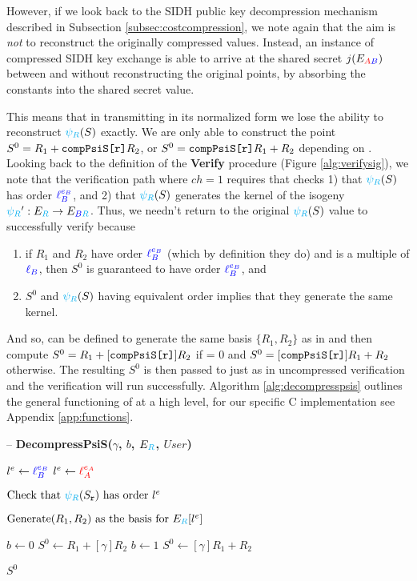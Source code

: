 However, if we look back to the SIDH public key decompression mechanism described in Subsection \ref{subsec:costcompression}, we note again that the aim is \textit{not} to reconstruct the originally compressed values. Instead, an instance of compressed SIDH key exchange is able to arrive at the shared secret $j(E_{\textcolor{red}{A}\textcolor{blue}{B}})$ between \alice and \bob without reconstructing the original points, by absorbing the constants into the shared secret value.

This means that in transmitting  in its normalized form we lose the ability to reconstruct $\textcolor{cyan}{\psi_R}(S)$ exactly. We are only able to construct the point $S^{0} = R_1 + \texttt{compPsiS[r]}R_2$, or $S^{0} = \texttt{compPsiS[r]}R_1 + R_2$ depending on . Looking back to the definition of the \textbf{Verify} procedure (Figure \ref{alg:verifysig}), we note that the verification path where $ch = 1$ requires that \alice checks 1) that $\textcolor{cyan}{\psi_R}(S)$ has order $\textcolor{blue}{\ell_{B}^{e_B}}$, and 2) that $\textcolor{cyan}{\psi_R}(S)$ generates the kernel of the isogeny $\textcolor{cyan}{\psi_R}' : E_{\textcolor{cyan}{R}} \rightarrow E_{\textcolor{blue}{B}\textcolor{cyan}{R}}$. Thus, we needn't return to the original $\textcolor{cyan}{\psi_R}(S)$ value to successfully verify because
\begin{enumerate}
\item if $R_1$ and $R_2$ have order $\textcolor{blue}{\ell_{B}^{e_B}}$ (which by definition they do) and  is a multiple of $\textcolor{blue}{\ell_{B}}$, then $S^{0}$ is guaranteed to have order $\textcolor{blue}{\ell_{B}^{e_B}}$, and
\item $S^{0}$ and $\textcolor{cyan}{\psi_R}(S)$ having equivalent order implies that they generate the same kernel.
\end{enumerate}

And so,  can be defined to generate the same basis $\{R_1, R_2\}$ as in  and then compute $S^{0} = R_1 + [\texttt{compPsiS[r]}]R_2$ if  = 0 and $S^{0} = [\texttt{compPsiS[r]}]R_1 + R_2$ otherwise. The resulting $S^{0}$ is then passed to   just as in uncompressed verification and the verification will run successfully. Algorithm \ref{alg:decompresspsis} outlines the general functioning of  at a high level, for our specific C implementation see Appendix \ref{app:functions}.

\begin{algorithm}
\caption{-- \textbf{DecompressPsiS($\gamma$, $b$, $E_{\textcolor{cyan}{R}}$, $User$)}}
\label{alg:decompresspsis}
\begin{algorithmic}[1]
	\State $l^e \gets \textcolor{blue}{\ell_{B}^{e_B}}$
\EndIf
{}
	\State $l^e \gets \textcolor{red}{\ell_{A}^{e_A}}$
\EndIf

\State $\text{Check that } \textcolor{cyan}{\psi_R}(S_{\texttt{r}}) \text{ has order } l^e$

\State $\text{Generate} (R_{1}, R_{2}) \text{ as the basis for } E_{\textcolor{cyan}{R}}[l^e]$

	\State $b \gets 0$
	\State $S^{0} \gets R_1 + [\gamma]R_2$
\Else
	\State $b \gets 1$
	\State $S^{0} \gets [\gamma]R_1 + R_2$
\EndIf

\State \Return $S^{0}$
\end{algorithmic}
\end{algorithm}

